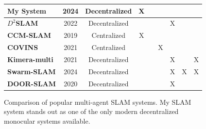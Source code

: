 \begin{figure}[h]
{\begin{tabular}{ |l|c|c|c|c|c|c|c|c| }
            \hline
            \textbf{My System}                                     & 2024                           & Decentralized          & X                                   &                                  &                        &                        &                        &                        \\
            \hline
            \textbf{$D^2$SLAM \autocite{xu2022d}}                  & 2022                           & Decentralized          &                                     &                                  &                        & X                      &                        &                        \\
            \hline
            \textbf{CCM-SLAM \autocite{schmuck2019ccm}}            & 2019                           & Centralized            & X                                   &                                  &                        &                        &                        &                        \\
            \hline
            \textbf{COVINS \autocite{schmuck2021covins}}           & 2021                           & Centralized            &                                     &                                  & X                      &                        &                        &                        \\
            \hline
            \textbf{Kimera-multi \autocite{tian22tro_kimeramulti}} & 2021                           & Decentralized          &                                     &                                  &                        & X                      &                        & X                      \\
            \hline
            \textbf{Swarm-SLAM \autocite{lajoieSwarmSLAM}}         & 2024                           & Decentralized          &                                     &                                  &                        & X                      & X                      & X                      \\
            \hline
            \textbf{DOOR-SLAM \autocite{Lajoie2020DOORSLAM}}       & 2020                           & Decentralized          &                                     &                                  &                        & X                      &                        &                        \\
            \hline
        \end{tabular}
    }

    \caption{Comparison of popular multi-agent SLAM systems. My SLAM system stands out as one of the only modern decentralized monocular systems available.}
    \label{fig:related-work-sensor-configurations}
\end{figure}

